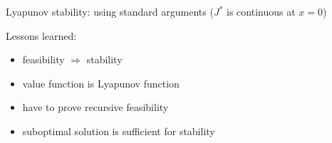 Lyapunov stability: using standard arguments ($J^*$ is continuous at $x=0$)

Lessons learned:
\begin{itemize}
\item feasibility $\Rightarrow$ stability
\item value function is Lyapunov function
\item have to prove recursive feasibility
\item suboptimal solution is sufficient for stability  
\end{itemize}

